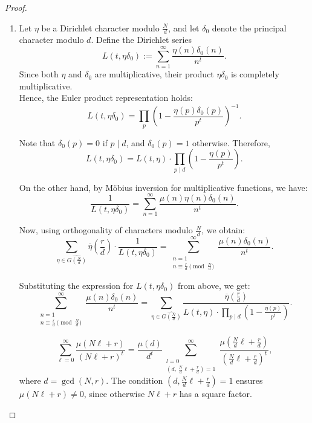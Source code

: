 \documentclass[12pt]{amsart}
\begin{document}
\begin{proof}






\begin{enumerate}[label= \roman*)]

\item 

Let $\eta$ be a Dirichlet character modulo $\frac{N}{d}$, and let $\delta_0$ denote the principal character modulo $d$. Define the Dirichlet series
\[
L(t, \eta \delta_0) := \sum_{n=1}^\infty \frac{\eta(n) \delta_0(n)}{n^t}.
\]
Since both $\eta$ and $\delta_0$ are multiplicative, their product $\eta \delta_0$ is completely multiplicative. \\

Hence, the Euler product representation holds:
\[
L(t, \eta \delta_0) = \prod_p \left( 1 - \frac{\eta(p) \delta_0(p)}{p^t} \right)^{-1}.
\]


Note that $\delta_0(p) = 0$ if $p \mid d$, and $\delta_0(p) = 1$ otherwise. Therefore,
\[
L(t, \eta \delta_0) = L(t, \eta) \cdot \prod_{p \mid d} \left( 1 - \frac{\eta(p)}{p^t} \right).
\]


On the other hand, by M\"obius inversion for multiplicative functions, we have:
\[
\frac{1}{L(t, \eta \delta_0)} = \sum_{n=1}^\infty \frac{\mu(n) \eta(n) \delta_0(n)}{n^t}.
\]


Now, using orthogonality of characters modulo $\frac{N}{d}$, we obtain:
\[
\sum_{\eta \in \widehat{G\left( \frac{N}{d} \right)}} \overline{\eta}\left( \frac{r}{d} \right) \cdot \frac{1}{L(t, \eta \delta_0)} 
= \sum_{\substack{n=1 \\ n \equiv \frac{r}{d}\pmod{\frac{N}{d}}}}^\infty \frac{\mu(n) \delta_0(n)}{n^t}.
\]


Substituting the expression for $L(t, \eta \delta_0)$ from above, we get:
\[
\sum_{\substack{n=1 \\ n \equiv \frac{r}{d}\pmod{\frac{N}{d}}}}^\infty \frac{\mu(n) \delta_0(n)}{n^t}
= \sum_{\eta \in \widehat{G\left( \frac{N}{d} \right)}} 
\frac{ \overline{\eta}\left( \frac{r}{d} \right) }{ L(t, \eta) \cdot \displaystyle\prod_{p \mid d} \left( 1 - \frac{\eta(p)}{p^t} \right) }.
\]


\begin{equation*}
\sum_{\ell=0}^\infty \frac{\mu(N\ell + r)}{(N\ell + r)^t}
= \frac{\mu(d)}{d^t} \sum_{\substack{l=0 \\ (d,\, \frac{N}{d}\ell + \frac{r}{d}) = 1}}^\infty \frac{\mu\left( \frac{N}{d}\ell + \frac{r}{d} \right)}{\left( \frac{N}{d}\ell + \frac{r}{d} \right)^t},
\end{equation*}
where $d = \gcd(N,r)$. The condition $(d, \frac{N}{d}\ell + \frac{r}{d}) = 1$ ensures $\mu(N\ell + r) \ne 0$, since otherwise $N\ell + r$ has a square factor.



\end{enumerate}
\end{proof}
\end{document}
